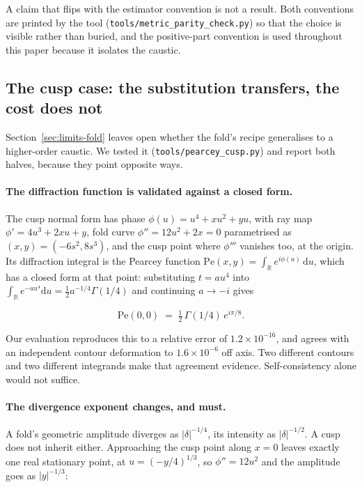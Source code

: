 A claim that flips with the estimator convention is not a result. Both
conventions are printed by the tool
(\texttt{tools/metric\_parity\_check.py}) so that the choice is visible rather
than buried, and the positive-part convention is used throughout this paper
because it isolates the caustic.

\subsection{The cusp case: the substitution transfers, the cost does not}
\label{sec:verify-cusp}

Section~\ref{sec:limits-fold} leaves open whether the fold's recipe generalises to
a higher-order caustic. We tested it (\texttt{tools/pearcey\_cusp.py}) and report
both halves, because they point opposite ways.

\paragraph{The diffraction function is validated against a closed form.}
The cusp normal form has phase $\phi(u)=u^4+xu^2+yu$, with ray map
$\phi'=4u^3+2xu+y$, fold curve $\phi''=12u^2+2x=0$ parametrised as
$(x,y)=(-6s^2,8s^3)$, and the cusp point where $\phi'''$ vanishes too, at the
origin. Its diffraction integral is the Pearcey function
$\mathrm{Pe}(x,y)=\int_{\mathbb{R}}e^{i\phi(u)}\,\mathrm{d}u$, which has a closed
form at that point: substituting $t=au^4$ into $\int_{\mathbb{R}}e^{-au^4}
\mathrm{d}u=\tfrac12 a^{-1/4}\Gamma(1/4)$ and continuing $a\to-i$ gives

\begin{equation}
\mathrm{Pe}(0,0) \;=\; \tfrac12\,\Gamma(1/4)\,e^{i\pi/8}.
\label{eq:pearcey-origin}
\end{equation}

Our evaluation reproduces this to a relative error of $1.2\times10^{-16}$, and
agrees with an independent contour deformation to $1.6\times10^{-6}$ off axis. Two different contours and two different integrands make that agreement evidence. Self-consistency alone would not suffice.

\paragraph{The divergence exponent changes, and must.}
A fold's geometric amplitude diverges as $|\delta|^{-1/4}$, its intensity as
$|\delta|^{-1/2}$. A cusp does not inherit either. Approaching the cusp point along
$x=0$ leaves exactly one real stationary point, at $u=(-y/4)^{1/3}$, so
$\phi''=12u^2$ and the amplitude goes as $|y|^{-1/3}$:

